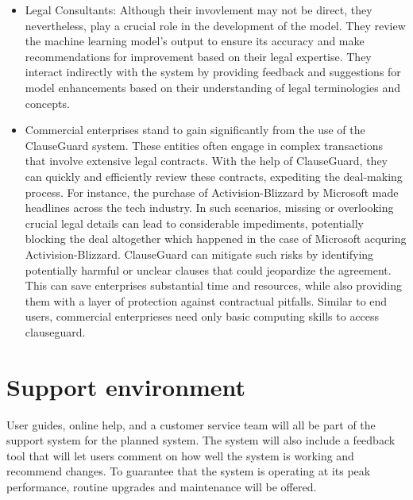 \begin{itemize}
    \item Legal Consultants: Although their invovlement may not be direct, they nevertheless, play a crucial role in the development of the model. They review the machine learning model's output to ensure its accuracy and make recommendations for improvement based on their legal expertise. They interact indirectly with the system by providing feedback and suggestions for model enhancements based on their understanding of legal terminologies and concepts.
    \item Commercial enterprises stand to gain significantly from the use of the ClauseGuard system. These entities often engage in complex transactions that involve extensive legal contracts. With the help of ClauseGuard, they can quickly and efficiently review these contracts, expediting the deal-making process. For instance,  the  purchase of Activision-Blizzard by Microsoft made headlines across the tech industry. In such scenarios, missing or overlooking crucial legal details can lead to considerable impediments, potentially blocking the deal altogether which happened in the case of Microsoft acquring Activision-Blizzard. ClauseGuard can mitigate such risks by identifying potentially harmful or unclear clauses that could jeopardize the agreement. This can save enterprises substantial time and resources, while also providing them with a layer of protection against contractual pitfalls. Similar to end users, commercial enterprieses need only basic computing skills to access clauseguard. 

\end{itemize}


\section{Support environment \label{Section::Support Environment proposed}}
User guides, online help, and a customer service team will all be part of the support system for the planned system. The system will also include a feedback tool that will let users comment on how well the system is working and recommend changes. To guarantee that the system is operating at its peak performance, routine upgrades and maintenance will be offered.

